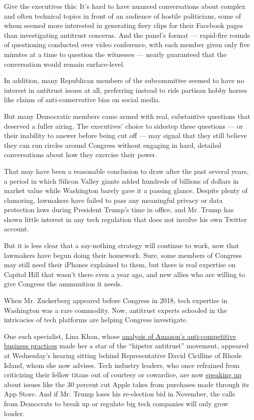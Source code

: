 Give the executives this: It's hard to have nuanced conversations about
complex and often technical topics in front of an audience of hostile
politicians, some of whom seemed more interested in generating fiery
clips for their Facebook pages than investigating antitrust concerns.
And the panel's format --- rapid-fire rounds of questioning conducted
over video conference, with each member given only five minutes at a
time to question the witnesses --- nearly guaranteed that the
conversation would remain surface-level.

In addition, many Republican members of the subcommittee seemed to have
no interest in antitrust issues at all, preferring instead to ride
partisan hobby horses like claims of anti-conservative bias on social
media.

But many Democratic members came armed with real, substantive questions
that deserved a fuller airing. The executives' choice to sidestep these
questions --- or their inability to answer before being cut off --- may
signal that they still believe they can run circles around Congress
without engaging in hard, detailed conversations about how they exercise
their power.

That may have been a reasonable conclusion to draw after the past
several years, a period in which Silicon Valley giants added hundreds of
billions of dollars in market value while Washington barely gave it a
passing glance. Despite plenty of clamoring, lawmakers have failed to
pass any meaningful privacy or data protection laws during President
Trump's time in office, and Mr. Trump has shown little interest in any
tech regulation that does not involve his own Twitter account.

But it is less clear that a say-nothing strategy will continue to work,
now that lawmakers have begun doing their homework. Sure, some members
of Congress may still need their iPhones explained to them, but there is
real expertise on Capitol Hill that wasn't there even a year ago, and
new allies who are willing to give Congress the ammunition it needs.

When Mr. Zuckerberg appeared before Congress in 2018, tech expertise in
Washington was a rare commodity. Now, antitrust experts schooled in the
intricacies of tech platforms are helping Congress investigate.

One such specialist, Lina Khan, whose
\href{https://www.nytimes3xbfgragh.onion/2018/09/07/technology/monopoly-antitrust-lina-khan-amazon.html}{analysis
of Amazon's anti-competitive business practices} made her a star of the
``hipster antitrust'' movement, appeared at Wednesday's hearing sitting
behind Representative David Cicilline of Rhode Island, whom she now
advises. Tech industry leaders, who once refrained from criticizing
their fellow titans out of courtesy or cowardice, are now
\href{https://gamerant.com/epic-games-ceo-tim-sweeney-criticizes-apples-app-store-fees/}{speaking
up} about issues like the 30 percent cut Apple takes from purchases made
through its App Store. And if Mr. Trump loses his re-election bid in
November, the calls from Democrats to break up or regulate big tech
companies will only grow louder.


